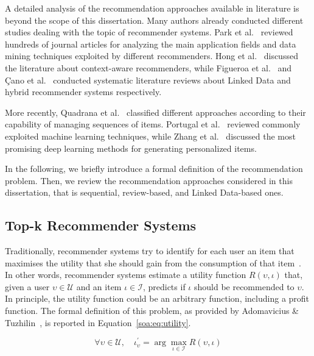 A detailed analysis of the recommendation approaches available in literature is beyond the scope of this dissertation. Many authors already conducted different studies dealing with the topic of recommender systems. Park et al.~\cite{Park2012} reviewed hundreds of journal articles for analyzing the main application fields and data mining techniques exploited by different recommenders. Hong et al.~\cite{Hong2009} discussed the literature about context-aware recommenders, while Figueroa et al.~\cite{Figueroa2015} and Çano et al.~\cite{Cano2017} conducted systematic literature reviews about Linked Data and hybrid recommender systems respectively.

More recently, Quadrana et al.~\cite{Quadrana2018} classified different approaches according to their capability of managing sequences of items. Portugal et al.~\cite{Portugal2018} reviewed commonly exploited machine learning techniques, while Zhang et al.~\cite{Zhang2019} discussed the most promising deep learning methods for generating personalized items.

In the following, we briefly introduce a formal definition of the recommendation problem. Then, we review the recommendation approaches considered in this dissertation, that is sequential, review-based, and Linked Data-based ones. 

\subsection{Top-k Recommender Systems}
\label{soa:sec:topk}

Traditionally, recommender systems try to identify for each user an item that maximises the utility that she should gain from the consumption of that item~\cite{Bobadilla2013}. In other words, recommender systems estimate a utility function $R(\upsilon, \iota)$ that, given a user $\upsilon \in \mathcal{U}$ and an item $\iota \in \mathcal{I}$, predicts if $\iota$ should be recommended to $\upsilon$. In principle, the utility function could be an arbitrary function, including a profit function. The formal definition of this problem, as provided by Adomavicius \& Tuzhilin~\cite{Adomavicius2015}, is reported in Equation~\ref{soa:eq:utility}.

\begin{equation}
\forall \upsilon \in \mathcal{U}, \quad \iota^{\prime}_{\upsilon} = \arg \max \limits_{\iota \in \mathcal{I}} R(\upsilon, \iota)
\label{soa:eq:utility}
\end{equation}

